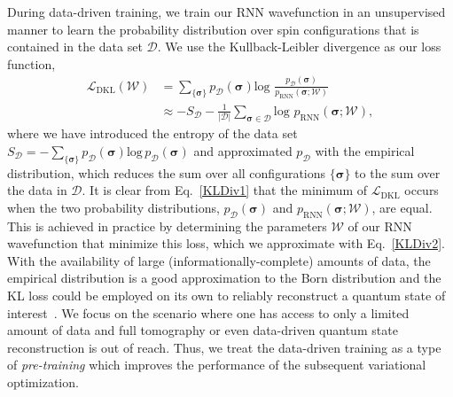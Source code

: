 \documentclass[twocolumn,
                showpacs,
                nofootinbib,
                nobibnotes,
                aps,
                superscriptaddress,
                amssymb,
                amsmath,
                floatfix,
                reprint,
                prx, 
                notitlepage,
                showkeys,
                10pt,
		]{revtex4-2}
\begin{document}
During data-driven training, we train our RNN wavefunction in an unsupervised manner to learn the probability distribution over spin configurations that is contained in the data set $\mathcal{D}$. We use the Kullback-Leibler divergence as our loss function, 
\begin{align}
    \mathcal{L}_{\text{DKL}}(\mathcal{W}) &= \sum_{\{\boldsymbol\sigma\}} p_{\mathcal{D}}(\boldsymbol\sigma)\text{log}\,\,\frac{p_{\mathcal{D}}(\boldsymbol\sigma)}{p_{\text{RNN}}(\boldsymbol\sigma;\mathcal{W})} \label{KLDiv1}\\
    &\approx - S_{\mathcal{D}} - \frac{1}{\vert\mathcal{D}\vert} \sum_{\boldsymbol\sigma \in \mathcal{D}} \text{log}\,\, p_{\text{RNN}}(\boldsymbol\sigma;\mathcal{W}),
    \label{KLDiv2}
\end{align}
where we have introduced the entropy of the data set $S_{\mathcal{D}}=-\sum_{\{\boldsymbol\sigma\}}p_{\mathcal{D}}(\boldsymbol\sigma)\text{log}\,p_{\mathcal{D}}(\boldsymbol\sigma)$ and approximated $p_{\mathcal{D}}$ with the empirical distribution, which reduces the sum over all configurations $\{\boldsymbol{\sigma}\}$ to the sum over the data in $\mathcal{D}$. 
It is clear from Eq.~\eqref{KLDiv1} that the minimum of $\mathcal{L}_{\text{DKL}}$ occurs when the two probability distributions, $p_{\mathcal{D}}(\boldsymbol\sigma)$ and $p_{\text{RNN}}(\boldsymbol\sigma;\mathcal{W})$, are equal. This is achieved in practice by determining the parameters $\mathcal{W}$ of our RNN wavefunction that minimize this loss, which we approximate with Eq.~\eqref{KLDiv2}.
With the availability of large (informationally-complete) amounts of data, the empirical distribution is a good approximation to the Born distribution and the KL loss could be employed on its own to reliably reconstruct a quantum state of interest~\cite{torlai2018neural}. 
We focus on the scenario where one has access to only a limited amount of data and full tomography or even data-driven quantum state reconstruction is out of reach. 
Thus, we treat the data-driven training as a type of \emph{pre-training} which improves the performance of the subsequent variational optimization. 
\end{document}
